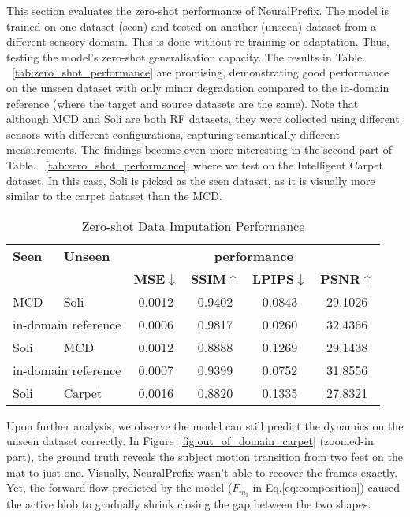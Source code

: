 \documentclass[10pt, conference, compsocconf]{IEEEtran}
\begin{document}
This section evaluates the zero-shot performance of NeuralPrefix. The model is trained on one dataset (seen) and tested on another (unseen) dataset from a different sensory domain. This is done without re-training or adaptation. Thus, testing the model's zero-shot generalisation capacity. The results in  Table. ~\ref{tab:zero_shot_performance} are promising, demonstrating good performance on the unseen dataset with only minor degradation compared to the in-domain reference (where the target and source datasets are the same). Note that although MCD and Soli are both RF datasets, they were collected using different sensors with different configurations, capturing semantically different measurements. The findings become even more interesting in the second part of Table. ~\ref{tab:zero_shot_performance}, where we test on the Intelligent Carpet dataset. In this case, Soli is picked as the seen dataset, as it is visually more similar to the carpet dataset than the MCD. 


\begin{table}[h!]
    \centering
    \caption{Zero-shot Data Imputation Performance}
    \label{tab:zero_shot_performance}
    \label{table:comparison}
    \begin{tabular}{llcccc}
        \toprule
        \textbf{Seen} &  \textbf{Unseen} &  \multicolumn{4}{c}{\textbf{ performance}} \\
        \cmidrule(lr){3-6} 
        & &  \textbf{MSE$\downarrow$} & 
        \textbf{SSIM$\uparrow$} &
        \textbf{LPIPS$\downarrow$} & 
        \textbf{PSNR$\uparrow$ }  
        \\
        \midrule
        MCD 
        & Soli & 0.0012 & 0.9402 & 0.0843 & 29.1026 \\
        \multicolumn{2}{c}{in-domain reference} & 0.0006 & 0.9817& 0.0260 & 32.4366 \\
        \midrule
        Soli
        & MCD&0.0012 & 0.8888 & 0.1269 & 29.1438 \\
       \multicolumn{2}{c}{in-domain reference} & 0.0007 & 0.9399 & 0.0752 & 31.8556 \\
       \bottomrule
       Soli & Carpet & 0.0016 & 0.8820  & 0.1335 & 27.8321 \\
        \bottomrule
    \end{tabular}
\end{table}


Upon further analysis, we observe the model can still predict the dynamics on the unseen dataset correctly. In Figure~\ref{fig:out_of_domain_carpet} (zoomed-in part), the ground truth reveals the subject motion transition from two feet on the mat to just one. Visually, NeuralPrefix wasn't able to recover the frames exactly. Yet, the forward flow predicted by the model ($F_{m_{i}}$ in Eq.\eqref{eq:composition}) caused the active blob to gradually shrink closing the gap between the two shapes.  
\end{document}
